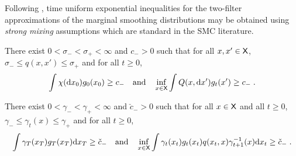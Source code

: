 \begin{rem}
Following \cite{douc:garivier:moulines:olsson:2011,dubarry:lecorff:2013,olsson:westerborn:2015}, time uniform exponential inequalities for the two-filter approximations of the marginal smoothing distributions may be obtained using {\em strong mixing} assumptions which are standard in the SMC literature.

\begin{assumptionmix}
\label{assum:mix}
There exist $0<\sigma_- < \sigma_+<\infty$ and $c_->0$ such that for all $x,x'\in\mathsf{X}$, $\sigma_- \le q(x,x')\le \sigma_+$ and for all $t\ge 0$,  \[
\int \chi (\mathrm{d} x_0)g_0(x_0)\ge c_-\quad\mbox{and}\quad\inf_{x\in\mathsf{X}}\int Q(x,\mathrm{d} x')g_t(x')\ge c_-\;.
\]
\end{assumptionmix}

\begin{assumptionmix}
\label{assum:mix:gamma}
There exist $0<\gamma_- < \gamma_+<\infty$ and $\check{c}_->0$ such that for all $x\in\mathsf{X}$ and all $t\ge0$, $\gamma_- \le \gamma_t(x)\le \gamma_+$ and for all $t\ge 0$,
\[
\int \gamma_T(x_T)g_T(x_T)\mathrm{d} x_T\ge \check{c}_- \quad\mbox{and}\quad\inf_{x\in\mathsf{X}}\int \gamma_t(x_t)g_t(x_t)q(x_t,x)\gamma_{t+1}^{-1}(x)\mathrm{d} x_t\ge \check{c}_-\;.
\]
\end{assumptionmix}


\end{rem}

